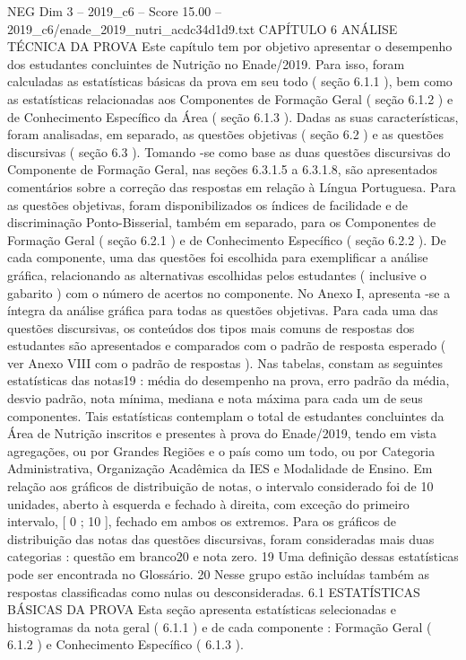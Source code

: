 \begin{textsample}{NEG Dim 3 – 2019\_c6 – Score 15.00 – 2019\_c6/enade\_2019\_nutri\_acdc34d1d9.txt}  \label{ex:f3_neg_268}
CAPÍTULO 6 ANÁLISE TÉCNICA DA PROVA Este capítulo tem por objetivo apresentar o desempenho dos estudantes concluintes de Nutrição no Enade/2019.
Para isso, foram calculadas as estatísticas básicas da prova em seu todo ( seção 6.1.1 ), bem como as estatísticas relacionadas aos Componentes de Formação Geral ( seção 6.1.2 ) e de Conhecimento Específico da Área ( seção 6.1.3 ).
Dadas as suas características, foram analisadas, em separado, as questões objetivas ( seção 6.2 ) e as questões discursivas ( seção 6.3 ).
Tomando -se como base as duas questões discursivas do Componente de Formação Geral, nas seções 6.3.1.5 a 6.3.1.8, são apresentados comentários sobre a correção das respostas em relação à Língua Portuguesa.
Para as questões objetivas, foram disponibilizados os índices de facilidade e de discriminação Ponto-Bisserial, também em separado, para os Componentes de Formação Geral ( seção 6.2.1 ) e de Conhecimento Específico ( seção 6.2.2 ).
De cada componente, uma das questões foi escolhida para exemplificar a análise gráfica, relacionando as alternativas escolhidas pelos estudantes ( inclusive o gabarito ) com o número de acertos no componente.
No Anexo I, apresenta -se a íntegra da análise gráfica para todas as questões objetivas.
Para cada uma das questões discursivas, os conteúdos dos tipos mais comuns de respostas dos estudantes são apresentados e comparados com o padrão de resposta esperado ( ver Anexo VIII com o padrão de respostas ).
Nas tabelas, constam as seguintes estatísticas das notas19 : média do desempenho na prova, erro padrão da média, desvio padrão, nota mínima, mediana e nota máxima para cada um de seus componentes.
Tais estatísticas contemplam o total de estudantes concluintes da Área de Nutrição inscritos e presentes à prova do Enade/2019, tendo em vista agregações, ou por Grandes Regiões e o país como um todo, ou por Categoria Administrativa, Organização Acadêmica da IES e Modalidade de Ensino.
Em relação aos gráficos de distribuição de notas, o intervalo considerado foi de 10 unidades, aberto à esquerda e fechado à direita, com exceção do primeiro intervalo, [ 0 ; 10 ], fechado em ambos os extremos.
Para os gráficos de distribuição das notas das questões discursivas, foram consideradas mais duas categorias : questão em branco20 e nota zero. 19 Uma definição dessas estatísticas pode ser encontrada no Glossário. 20 Nesse grupo estão incluídas também as respostas classificadas como nulas ou desconsideradas. 6.1 ESTATÍSTICAS BÁSICAS DA PROVA Esta seção apresenta estatísticas selecionadas e histogramas da nota geral ( 6.1.1 ) e de cada componente : Formação Geral ( 6.1.2 ) e Conhecimento Específico ( 6.1.3 ).

\end{textsample}
